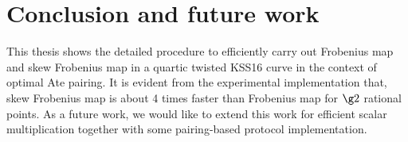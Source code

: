\begin{table}[!ht]
\caption{Computational cost}
\label{tab2}
\end{table}
\renewcommand{\baselinestretch}{1.0}

\section{Conclusion and future work}
This thesis shows the detailed procedure to efficiently carry out Frobenius map and skew Frobenius map in a quartic twisted KSS16 curve in the context of optimal Ate pairing. It is  evident from the experimental implementation that, skew Frobenius map is about 4 times faster than Frobenius map for $\g2$ rational points. As a future work, we would like to extend this work for efficient scalar multiplication together with some pairing-based protocol implementation.



